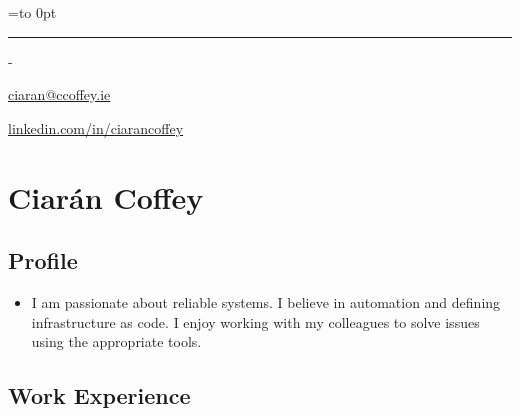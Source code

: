 \documentclass[]{article}
\date{}
\providecommand{\tightlist}{%
  \setlength{\itemsep}{0pt}\setlength{\parskip}{0pt}}
\newenvironment{nospace}
  {\par\edef\theprevdepth{\the\prevdepth}\nointerlineskip
   \setbox\zerobox=\vtop to 0pt\bgroup
   \hrule height0pt\kern\dimexpr\baselineskip-\topskip\relax
  }
  {\par\vss\egroup\ht\zerobox=0pt \wd\zerobox=0pt \dp\zerobox=0pt
   \box\zerobox}
\begin{document}
\begin{nospace}\begin{flushright}
\vspace{-2em}\href{mailto:ciaran@ccoffey.ie}{ciaran@ccoffey.ie}

\href{http://linkedin.com/in/ciarancoffey}{linkedin.com/in/ciarancoffey}
\end{flushright}\end{nospace}

\hypertarget{ciaruxe1n-coffey}{%
\section{Ciarán Coffey}\label{ciaruxe1n-coffey}}

\hypertarget{profile}{%
\subsection{Profile}\label{profile}}

\begin{itemize}
\tightlist
\item
  I am passionate about reliable systems. I believe in automation and
  defining infrastructure as code. I enjoy working with my colleagues to
  solve issues using the appropriate tools.
\end{itemize}

\hypertarget{work-experience}{%
\subsection{Work Experience}\label{work-experience}}
\end{document}
